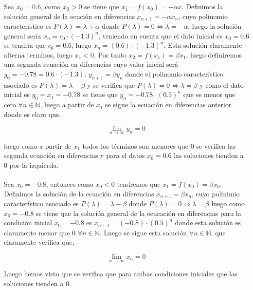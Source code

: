 \documentclass{article}
\begin{document}
Sea $x_0 = 0.6$, como $x_0 > 0$ se tiene que $x_1 = f(x_0) = -\alpha x$. Definimos la solución general de la ecución en diferencias $x_{n+1} = -\alpha x_n$, cuyo polinomio característico es $P(\lambda)=\lambda + \alpha$ donde $P(\lambda) = 0 \Leftrightarrow \lambda = -\alpha$, luego la solución general sería $x_{n} = c_0\cdot(-1.3)^n$, teniendo en cuenta que el dato inicial es $x_0 = 0.6$ se tendría que $c_0 = 0.6$, luego $x_{n} = (0.6)\cdot(-1.3)^n$. Esta solución claramente alterna terminos, luego $x_1 < 0$. Por tanto $x_2 = f(x_1) = \beta x_1$, luego definiremos una segunda ecuación en diferencias cuyo valor inicial será $y_0 = -0.78 = 0.6\cdot(-1.3)$. $y_{n+1} = \beta y_n$ donde el polinomio característico asociado es $P(\lambda)= \lambda - \beta$ y se verifica que $P(\lambda) = 0 \Leftrightarrow \lambda = \beta$ y como el dato inicial es $y_0 = x_1 = -0.78$ se tiene que $y_{n} = -0.78\cdot(0.5)^n$ que es menor que cero $\forall n \in \mathbb{N}$, luego a partir de $x_1$ se sigue la ecuación en diferencias anterior donde es claro que,

\begin{equation*}
\lim_{n \to \infty} y_n = 0
\end{equation*}

luego como a partir de $x_1$ todos los términos son menores que 0 se verifica las segunda ecuación en diferencias y para el datos $x_0 = 0.6$ las soluciones tienden a 0 por la izquierda. \\ \\

Sea $x_0 = -0.8$, entonces como $x_0 < 0$ tendremos que $x_1 = f(x_0) = \beta x_0$. Definimos la solución de la ecuación en diferencias $x_{n+1} = \beta x_n$, cuyo polinimio característico asociado es $P(\lambda) = \lambda - \beta$ donde $P(\lambda)= 0 \Leftrightarrow \lambda = \beta$ luego como $x_0 = -0.8$ se tiene que la solución general de la ecucación en diferencias para la condición inicial $x_0=-0.8$ es $x_{n+1} = (-0.8)\cdot(0.5)^n$ donde esta solución es claramente menor que 0 $\forall n \in \mathbb{N}$. Luego se sigue esta solución $\forall n \in \mathbb{N}$, que claramente verifica que,

\begin{equation*}
\lim_{n \to \infty} x_n = 0
\end{equation*}

Luego hemos visto que se verifica que para ambas condiciones iniciales que las soluciones tienden a 0. \\ \\
\end{document}
